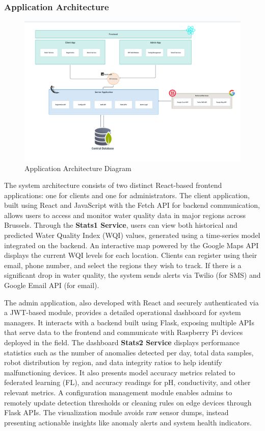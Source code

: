\subsubsection{Application Architecture}
\begin{figure}[H]
    \centering
    \includegraphics[width=0.75\linewidth]{Figures/ApplicatArch.png}
    \caption{Application Architecture Diagram}
    \label{fig:enter-label}
\end{figure}
The system architecture consists of two distinct React-based frontend applications: one for clients and one for administrators. The client application, built using React and JavaScript with the Fetch API for backend communication, allows users to access and monitor water quality data in major regions across Brussels. Through the \textbf{Stats1 Service}, users can view both historical and predicted Water Quality Index (WQI) values, generated using a time-series model integrated on the backend. An interactive map powered by the Google Maps API displays the current WQI levels for each location. Clients can register using their email, phone number, and select the regions they wish to track. If there is a significant drop in water quality, the system sends alerts via Twilio (for SMS) and Google Email API (for email).

The admin application, also developed with React and securely authenticated via a JWT-based module, provides a detailed operational dashboard for system managers. It interacts with a backend built using Flask, exposing multiple APIs that serve data to the frontend and communicate with Raspberry Pi devices deployed in the field. The dashboard \textbf{Stats2 Service} displays performance statistics such as the number of anomalies detected per day, total data samples, robot distribution by region, and data integrity ratios to help identify malfunctioning devices. It also presents model accuracy metrics related to federated learning (FL), and accuracy readings for pH, conductivity, and other relevant metrics. A configuration management module enables admins to remotely update detection thresholds or cleaning rules on edge devices through Flask APIs. The visualization module avoids raw sensor dumps, instead presenting actionable insights like anomaly alerts and system health indicators.




